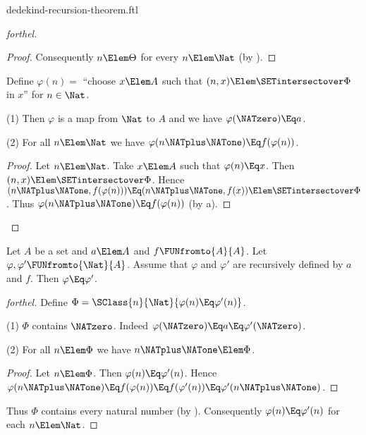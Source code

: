 \documentclass{stex}
\begin{document}
\begin{smodule}{dedekind-recursion-theorem.ftl}
\begin{proof}[forthel]
\begin{proof}
    Consequently $n \Elem \Theta$ for every $n \Elem \Nat$ (by ).
  \end{proof}

  Define $\varphi(n) =$ ``choose $x \Elem A$ such that $(n, x) \Elem
  \SETintersectover \Phi$ in $x$'' for $n \in \Nat$.

  (1) Then $\varphi$ is a map from $\Nat$ to $A$ and we have
  $\varphi(\NATzero) \Eq a$.

  (2) For all $n \Elem \Nat$ we have $\varphi(n \NATplus \NATone) \Eq
  f(\varphi(n))$.
  \begin{proof}
    Let $n \Elem \Nat$.
    Take $x \Elem A$ such that $\varphi(n) \Eq x$.
    Then $(n, x) \Elem \SETintersectover \Phi$.
    Hence $(n \NATplus \NATone, f(\varphi(n))) \Eq (n \NATplus \NATone, f(x)) \Elem \SETintersectover \Phi$.
    Thus $\varphi(n \NATplus \NATone) \Eq f(\varphi(n))$ (by a).
  \end{proof}
\end{proof}


\begin{theorem}[forthel,title=Dedekind's Recursion Theorem: Uniqueness,name=Dedekind Recursion Uniqueness]
  Let $A$ be a set and $a \Elem A$ and $f \FUNfromto{A}{A}$.
  Let $\varphi, \varphi' \FUNfromto{\Nat}{A}$.
  Assume that $\varphi$ and $\varphi'$ are recursively defined by $a$ and
  $f$.
  Then $\varphi \Eq \varphi'$.
\end{theorem}
\begin{proof}[forthel]
  Define $\Phi = \SClass{n}{\Nat}{\varphi(n) \Eq \varphi'(n)}$.

  (1) $\Phi$ contains $\NATzero$.
  Indeed $\varphi(\NATzero) \Eq a \Eq \varphi'(\NATzero)$.

  (2) For all $n \Elem \Phi$ we have $n \NATplus \NATone \Elem \Phi$.
  \begin{proof}
    Let $n \Elem \Phi$.
    Then $\varphi(n) \Eq \varphi'(n)$.
    Hence $\varphi(n \NATplus \NATone)
      \Eq f(\varphi(n))
      \Eq f(\varphi'(n))
      \Eq \varphi'(n \NATplus \NATone)$.
    \end{proof}

  Thus $\Phi$ contains every natural number (by ).
  Consequently $\varphi(n) \Eq \varphi'(n)$ for each $n \Elem \Nat$.
\end{proof}
\end{smodule}
\end{document}
